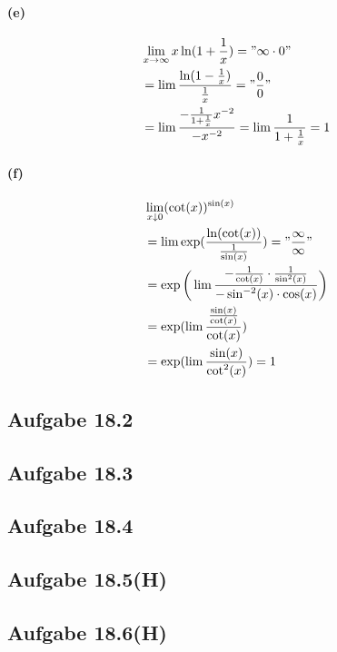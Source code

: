 \newpage

\paragraph{(e)}
\begin{align*}
&\lim_{x\rightarrow\infty}x\ln(1+\frac{1}{x})="\infty\cdot0"\\
&=\lim\frac{\ln(1-\frac{1}{x})}{\frac{1}{x}}="\frac{0}{0}"\\
&=\lim\frac{-\frac{1}{1+\frac{1}{x}}x^{-2}}{-x^{-2}}=\lim\frac{1}{1+\frac{1}{x}}=1
\end{align*}

\paragraph{(f)}
\begin{align*}
&\lim_{x\downarrow0}(\cot(x))^{\sin(x)}\\
&=\lim\exp(\frac{\ln(\cot(x))}{\frac{1}{\sin(x)}})="\frac{\infty}{\infty}"\\
&=\exp\bigg(\lim\frac{-\frac{1}{\cot(x)}\cdot\frac{1}{\sin^2(x)}}{-\sin^{-2}(x)\cdot\cos(x)}\bigg)\\
&=\exp(\lim\frac{\frac{\sin(x)}{\cot(x)}}{\cot(x)})\\
&=\exp(\lim\frac{\sin(x)}{\cot^2(x)})=1
\end{align*}

\newpage

\subsection{Aufgabe 18.2}

\subsection{Aufgabe 18.3}

\subsection{Aufgabe 18.4}

\subsection{Aufgabe 18.5(H)}

\subsection{Aufgabe 18.6(H)}

